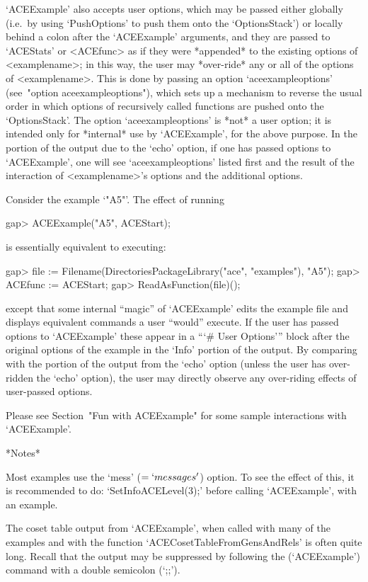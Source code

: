 `ACEExample' also accepts user options, which  may  be  passed  either
globally  (i.e.~by  using  `PushOptions'  to  push   them   onto   the
`OptionsStack') or locally  behind  a  colon  after  the  `ACEExample'
arguments, and they are passed to `ACEStats' or <ACEfunc> as  if  they
were *appended* to the existing options of <examplename>; in this way,
the user may *over-ride* any or all of the options  of  <examplename>.
This is done by passing  an  option  `aceexampleoptions'  (see~"option
aceexampleoptions"), which sets up a mechanism to  reverse  the  usual
order in which options of recursively called functions are pushed onto
the `OptionsStack'. The option `aceexampleoptions'  is  *not*  a  user
option; it is intended only for *internal* use  by  `ACEExample',  for
the above purpose. In the portion of the  output  due  to  the  `echo'
option, if one has  passed  options  to  `ACEExample',  one  will  see
`aceexampleoptions' listed first and the result of the interaction  of
<examplename>'s options and the additional options.

Consider the example `"A5"'. The effect of running

\beginexample
gap> ACEExample("A5", ACEStart);
\endexample

is essentially equivalent to executing:

\beginexample
gap> file := Filename(DirectoriesPackageLibrary("ace", "examples"), "A5");
gap> ACEfunc := ACEStart;
gap> ReadAsFunction(file)();
\endexample

except that some internal ``magic'' of `ACEExample' edits the  example
file and displays equivalent commands a user ``would'' execute. If the
user  has  passed  options  to  `ACEExample'   these   appear   in   a
```\# User Options''' block after the original options of the  example
in the `Info' portion of the output. By comparing with the portion  of
the output from the `echo' option (unless the user has over-ridden the
`echo' option), the user may directly observe any over-riding  effects
of user-passed options.

Please see Section~"Fun with ACEExample" for some sample  interactions
with `ACEExample'.

*Notes*

Most examples use the `mess'  ($=  `messages'$)  option.  To  see  the
effect of this, it is recommended to do: `SetInfoACELevel(3);'  before
calling `ACEExample', with an example.

The coset table output from `ACEExample', when called with many of the
examples and with the {\ACE}  function  `ACECosetTableFromGensAndRels'
is often quite long. Recall that  the  output  may  be  suppressed  by
following the (`ACEExample') command with a double semicolon (`;;').

